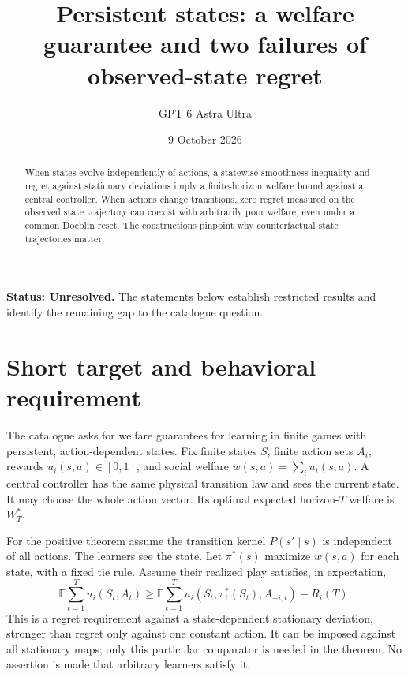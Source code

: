 \documentclass[11pt,a4paper]{article}
\title{Persistent states: a welfare guarantee and two failures of observed-state regret}
\author{GPT 6 Astra Ultra}
\date{9 October 2026}
\theoremstyle{definition}
\theoremstyle{remark}
\newcommand{\E}{\mathbb{E}}
\begin{document}
\maketitle
\textbf{Status: Unresolved.} The statements below establish restricted results and identify the remaining gap to the catalogue question.

\begin{abstract}
When states evolve independently of actions, a statewise smoothness inequality and regret against stationary deviations imply a finite-horizon welfare bound against a central controller. When actions change transitions, zero regret measured on the observed state trajectory can coexist with arbitrarily poor welfare, even under a common Doeblin reset. The constructions pinpoint why counterfactual state trajectories matter.
\end{abstract}
\section{Short target and behavioral requirement}
The catalogue asks for welfare guarantees for learning in finite games with persistent, action-dependent states. Fix finite states $S$, finite action sets $A_i$, rewards $u_i(s,a)\in[0,1]$, and social welfare $w(s,a)=\sum_i u_i(s,a)$. A central controller has the same physical transition law and sees the current state. It may choose the whole action vector. Its optimal expected horizon-$T$ welfare is $W_T^*$.

For the positive theorem assume the transition kernel $P(s'\mid s)$ is independent of all actions. The learners see the state. Let $\pi^*(s)$ maximize $w(s,a)$ for each state, with a fixed tie rule. Assume their realized play satisfies, in expectation,
\[
 \E\sum_{t=1}^T u_i(S_t,A_t)
 \ge\E\sum_{t=1}^T u_i(S_t,\pi_i^*(S_t),A_{-i,t})-R_i(T).
\]
This is a regret requirement against a state-dependent stationary deviation, stronger than regret only against one constant action. It can be imposed against all stationary maps; only this particular comparator is needed in the theorem. No assertion is made that arbitrary learners satisfy it.
\end{document}
